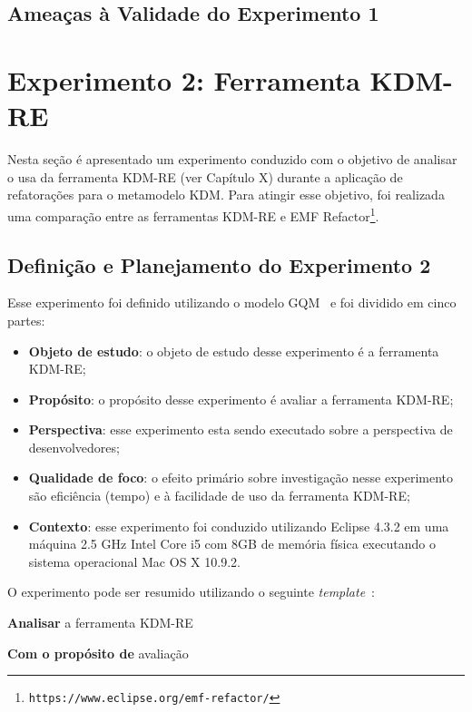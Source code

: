 \subsection{Ameaças à Validade do Experimento 1}





\section{Experimento 2: Ferramenta KDM-RE}\label{sec:experimento_KDM_re}

Nesta seção é apresentado um experimento conduzido com o objetivo de analisar o usa da ferramenta KDM-RE (ver Capítulo X) durante a aplicação de refatorações para o metamodelo KDM. Para atingir esse objetivo, foi realizada uma comparação entre as ferramentas KDM-RE e EMF Refactor\footnote{\texttt{https://www.eclipse.org/emf-refactor/}}.

\subsection{Definição e Planejamento do Experimento 2}

Esse experimento foi definido utilizando o modelo GQM~\cite{Wohlin} e foi dividido em cinco partes:

\begin{itemize}
\item \textbf{Objeto de estudo}: o objeto de estudo desse experimento é a ferramenta KDM-RE;
\item \textbf{Propósito}: o propósito desse experimento é avaliar a ferramenta KDM-RE;
\item \textbf{Perspectiva}: esse experimento esta sendo executado sobre a perspectiva de desenvolvedores;
\item \textbf{Qualidade de foco}: o efeito primário sobre investigação nesse experimento são eficiência (tempo) e à facilidade de uso da ferramenta KDM-RE;
\item \textbf{Contexto}: esse experimento foi conduzido utilizando Eclipse 4.3.2 em uma máquina 2.5 GHz Intel Core i5 com 8GB de memória física executando o sistema operacional Mac OS X 10.9.2.
\end{itemize}

O experimento pode ser resumido utilizando o seguinte \textit{template}~\cite{Wohlin}:

\textbf{Analisar} a ferramenta KDM-RE

\textbf{Com o propósito de} avaliação


